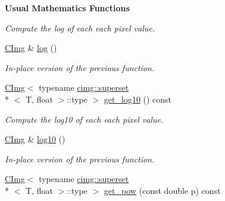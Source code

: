 \begin{Indent}{\bf Usual Mathematics Functions}
\begin{DoxyCompactItemize}
\begin{DoxyCompactList}\small\item\em Compute the log of each each pixel value. \end{DoxyCompactList}\item 
\hypertarget{structcimg__library_1_1_c_img_aeddcf36f773b7ec82bd65af9f628184d}{\hyperlink{structcimg__library_1_1_c_img}{C\-Img} \& \hyperlink{structcimg__library_1_1_c_img_aeddcf36f773b7ec82bd65af9f628184d}{log} ()}\label{structcimg__library_1_1_c_img_aeddcf36f773b7ec82bd65af9f628184d}

\begin{DoxyCompactList}\small\item\em In-\/place version of the previous function. \end{DoxyCompactList}\item 
\hypertarget{structcimg__library_1_1_c_img_ab900cf5313500b79ff4c7ef9e646d81f}{\hyperlink{structcimg__library_1_1_c_img}{C\-Img}$<$ typename \hyperlink{structcimg__library_1_1cimg_1_1superset}{cimg\-::superset}\\*
$<$ T, float $>$\-::type $>$ \hyperlink{structcimg__library_1_1_c_img_ab900cf5313500b79ff4c7ef9e646d81f}{get\-\_\-log10} () const }\label{structcimg__library_1_1_c_img_ab900cf5313500b79ff4c7ef9e646d81f}

\begin{DoxyCompactList}\small\item\em Compute the log10 of each each pixel value. \end{DoxyCompactList}\item 
\hypertarget{structcimg__library_1_1_c_img_ae3da2a5d00cb920aae818c767989541c}{\hyperlink{structcimg__library_1_1_c_img}{C\-Img} \& \hyperlink{structcimg__library_1_1_c_img_ae3da2a5d00cb920aae818c767989541c}{log10} ()}\label{structcimg__library_1_1_c_img_ae3da2a5d00cb920aae818c767989541c}

\begin{DoxyCompactList}\small\item\em In-\/place version of the previous function. \end{DoxyCompactList}\item 
\hypertarget{structcimg__library_1_1_c_img_aeb1f02ad71828cf54020c27e8e8921e4}{\hyperlink{structcimg__library_1_1_c_img}{C\-Img}$<$ typename \hyperlink{structcimg__library_1_1cimg_1_1superset}{cimg\-::superset}\\*
$<$ T, float $>$\-::type $>$ \hyperlink{structcimg__library_1_1_c_img_aeb1f02ad71828cf54020c27e8e8921e4}{get\-\_\-pow} (const double p) const }\label{structcimg__library_1_1_c_img_aeb1f02ad71828cf54020c27e8e8921e4}


\end{DoxyCompactItemize}
\end{Indent}
